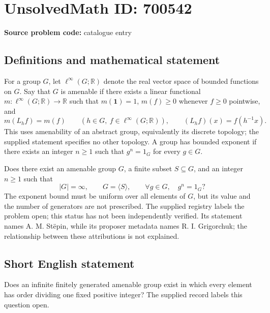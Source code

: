 \documentclass[11pt]{article}
\newcommand{\R}{\mathbb{R}}
\begin{document}
\section*{UnsolvedMath ID: 700542}
\textbf{Source problem code:} catalogue entry
\subsection{Definitions and mathematical statement}
For a group \(G\), let \(\ell^\infty(G;\R)\) denote the real vector space of bounded functions on \(G\). Say that \(G\) is amenable if there exists a linear functional \(m:\ell^\infty(G;\R)\to\R\) such that \(m(\mathbf{1})=1\), \(m(f)\geq 0\) whenever \(f\geq 0\) pointwise, and
\[
 m(L_hf)=m(f)\qquad(h\in G,\ f\in\ell^\infty(G;\R)),
 \qquad (L_hf)(x)=f(h^{-1}x).
\]
This uses amenability of an abstract group, equivalently its discrete topology; the supplied statement specifies no other topology. A group has bounded exponent if there exists an integer \(n\geq 1\) such that \(g^n=1_G\) for every \(g\in G\).

Does there exist an amenable group \(G\), a finite subset \(S\subseteq G\), and an integer \(n\geq 1\) such that
\[
 |G|=\infty,\qquad G=\langle S\rangle,\qquad
 \forall g\in G,\quad g^n=1_G?
\]
The exponent bound must be uniform over all elements of \(G\), but its value and the number of generators are not prescribed. The supplied registry labels the problem open; this status has not been independently verified. Its statement names A. M. St\"epin, while its proposer metadata names R. I. Grigorchuk; the relationship between these attributions is not explained.
\subsection{Short English statement}
Does an infinite finitely generated amenable group exist in which every element has order dividing one fixed positive integer? The supplied record labels this question open.
\end{document}
